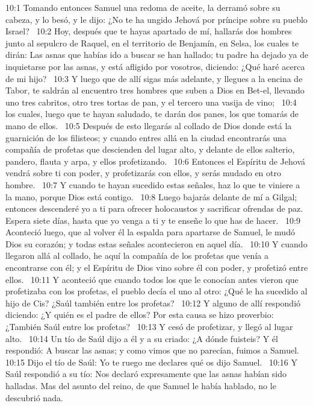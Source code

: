 10:1 Tomando entonces Samuel una redoma de aceite, la derramó sobre su cabeza, y lo besó, y le dijo: ¿No te ha ungido Jehová por príncipe sobre su pueblo Israel?  
10:2 Hoy, después que te hayas apartado de mí, hallarás dos hombres junto al sepulcro de Raquel, en el territorio de Benjamín, en Selsa, los cuales te dirán: Las asnas que habías ido a buscar se han hallado; tu padre ha dejado ya de inquietarse por las asnas, y está afligido por vosotros, diciendo: ¿Qué haré acerca de mi hijo?  
10:3 Y luego que de allí sigas más adelante, y llegues a la encina de Tabor, te saldrán al encuentro tres hombres que suben a Dios en Bet-el, llevando uno tres cabritos, otro tres tortas de pan, y el tercero una vasija de vino;  
10:4 los cuales, luego que te hayan saludado, te darán dos panes, los que tomarás de mano de ellos.  
10:5 Después de esto llegarás al collado de Dios donde está la guarnición de los filisteos; y cuando entres allá en la ciudad encontrarás una compañía de profetas que descienden del lugar alto, y delante de ellos salterio, pandero, flauta y arpa, y ellos profetizando.  
10:6 Entonces el Espíritu de Jehová vendrá sobre ti con poder, y profetizarás con ellos, y serás mudado en otro hombre.  
10:7 Y cuando te hayan sucedido estas señales, haz lo que te viniere a la mano, porque Dios está contigo.  
10:8 Luego bajarás delante de mí a Gilgal; entonces descenderé yo a ti para ofrecer holocaustos y sacrificar ofrendas de paz. Espera siete días, hasta que yo venga a ti y te enseñe lo que has de hacer.  
10:9 Aconteció luego, que al volver él la espalda para apartarse de Samuel, le mudó Dios su corazón; y todas estas señales acontecieron en aquel día.  
10:10 Y cuando llegaron allá al collado, he aquí la compañía de los profetas que venía a encontrarse con él; y el Espíritu de Dios vino sobre él con poder, y profetizó entre ellos.  
10:11 Y aconteció que cuando todos los que le conocían antes vieron que profetizaba con los profetas, el pueblo decía el uno al otro: ¿Qué le ha sucedido al hijo de Cis? ¿Saúl también entre los profetas?  
10:12 Y alguno de allí respondió diciendo: ¿Y quién es el padre de ellos? Por esta causa se hizo proverbio: ¿También Saúl entre los profetas?  
10:13 Y cesó de profetizar, y llegó al lugar alto.  
10:14 Un tío de Saúl dijo a él y a su criado: ¿A dónde fuisteis? Y él respondió: A buscar las asnas; y como vimos que no parecían, fuimos a Samuel.  
10:15 Dijo el tío de Saúl: Yo te ruego me declares qué os dijo Samuel.  
10:16 Y Saúl respondió a su tío: Nos declaró expresamente que las asnas habían sido halladas. Mas del asunto del reino, de que Samuel le había hablado, no le descubrió nada.  
